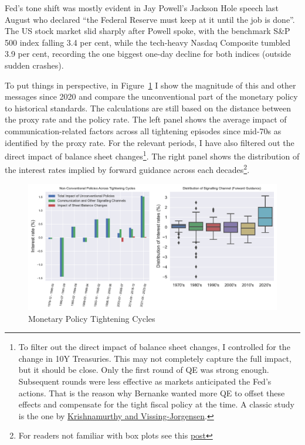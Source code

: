 \documentclass[
  letterpaper,
  DIV=11,
  numbers=noendperiod]{scrartcl}
\begin{document}
Fed's tone shift was mostly evident in Jay Powell's Jackson Hole speech
last August who declared ``the Federal Reserve must keep at it until the
job is done''. The US stock market slid sharply after Powell spoke, with
the benchmark S\&P 500 index falling 3.4 per cent, while the tech-heavy
Nasdaq Composite tumbled 3.9 per cent, recording the one biggest one-day
decline for both indices (outside sudden crashes).

To put things in perspective, in Figure~\ref{fig-3} I show the magnitude
of this and other messages since 2020 and compare the unconventional
part of the monetary policy to historical standards. The calculations
are still based on the distance between the proxy rate and the policy
rate. The left panel shows the average impact of communication-related
factors across all tightening episodes since mid-70s as identified by
the proxy rate. For the relevant periods, I have also filtered out the
direct impact of balance sheet changes\footnote{To filter out the direct
  impact of balance sheet changes, I controlled for the change in 10Y
  Treasuries. This may not completely capture the full impact, but it
  should be close. Only the first round of QE was strong enough.
  Subsequent rounds were less effective as markets anticipated the Fed's
  actions. That is the reason why Bernanke wanted more QE to offset
  these effects and compensate for the tight fiscal policy at the time.
  A classic study is the one by
  \href{https://www.nber.org/papers/w17555}{Krishnamurthy and
  Vissing-Jorgensen}.}. The right panel shows the distribution of the
interest rates implied by forward guidance across each
decades\footnote{For readers not familiar with box plots see this
  \href{https://en.wikipedia.org/wiki/Box_plot}{post}}.

\begin{figure}

{\centering \includegraphics{Hawkish_Fed_files/figure-pdf/fig-3-output-1.pdf}

}

\caption{\label{fig-3}Monetary Policy Tightening Cycles}

\end{figure}
\end{document}
